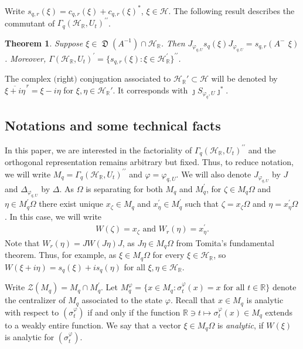 \documentclass[12pt, a4paper,reqno]{amsart}
\newtheorem{Theorem}{Theorem}[section]
\theoremstyle{definition}
\def\R{\mathbb R}
\newcommand{\CH}{\mathcal{H}}
\DeclareMathOperator{\dom}{\mathfrak{D}}
\DeclareMathOperator{\fhalf}{\frac{1}{2} }
\begin{document}
Write $ s_{q, r}(\xi) = c_{q, r}(\xi) + c_{q, r}(\xi)^*$, $\xi\in\CH$. The following result describes the commutant of $\Gamma_q(\CH_\R, U_t)^{\prime\prime}$.

\begin{Theorem}\cite[Thm. 2.4]{bik-kunal}\label{commutant}
Suppose $ \xi \in \dom(A^{-1})\cap \CH_\R $. Then $J_{\varphi_{q,U}}s_q(\xi) J_{\varphi_{q,U}} = s_{q, r}(A^{-\fhalf} \xi)$. Moreover, $\Gamma(\CH_{\R}, U_{t})^{\prime}=\{s_{q, r}(\xi): \xi\in \CH_\R^\prime\}^{\prime\prime}$.
\end{Theorem}
The complex $($right$)$ conjugation associated to $\CH_\R'\subset \CH$ will be denoted by $\overline{\xi+ i \eta}^{\,r}=\xi-i \eta$ for $\xi,\eta\in\CH_\R'$. It corresponds with $\jmath S_{\varphi_q,U}\jmath^*$.  

\subsection{Notations and some technical facts}\label{not}

In this paper, we are interested in the factoriality of $\Gamma_q(\CH_\R, U_t)^{\prime\prime}$ and the orthogonal representation remains arbitrary but fixed. Thus, to reduce notation, we will write $M_q=\Gamma_q(\CH_\R, U_t)^{\prime\prime}$ and $\varphi=\varphi_{q,U}$. We will also denote $J_{\varphi_{q,U}}$ by $J$ and $\Delta_{\varphi_{q,U}}$ by $\Delta$. As $\Omega$ is separating for both $M_q$ and $M_q^{\prime}$, for $\zeta\in M_q\Omega$ and $\eta\in M_q^{\prime}\Omega$ there exist unique $x_{\zeta}\in M_q$ and $x^{\prime}_{\eta}\in M_q^{\prime}$ such that $\zeta =x_{\zeta}\Omega$ and $\eta=x_{\eta}^{\prime}\Omega$. In this case, we will write 
\begin{align*}
W(\zeta)=x_{\zeta} \text{ and } W_r(\eta)=x_{\eta}^{\prime}. 
\end{align*}
Note that $W_r(\eta)= JW(J\eta)J$, as $J\eta\in M_q\Omega$ from Tomita's fundamental theorem. Thus, for example, as $\xi\in M_q\Omega$ for every $\xi\in \CH_\R$, so $W(\xi+i\eta)=s_q(\xi)+is_q(\eta)$ for all $\xi,\eta\in\CH_\R$.

Write $\mathcal{Z}(M_q)= M_q\cap M_q^{\prime}$. Let $M_q^{\varphi}=\{x\in M_q: \sigma_t^{\varphi}(x)=x \text{ for all }t\in\R\}$ denote the centralizer of $M_q$ associated to the state $\varphi$. Recall that $x\in M_q$ is analytic with respect to $(\sigma_t^{\varphi})$ if and only if the function 
$\R \ni t\mapsto \sigma_t^{\varphi}(x)\in M_q$ extends to a weakly entire function. We say that a vector $\xi\in M_q\Omega$ is \textit{analytic}, if $W(\xi)$ is analytic for $(\sigma_t^{\varphi})$. 
\end{document}
